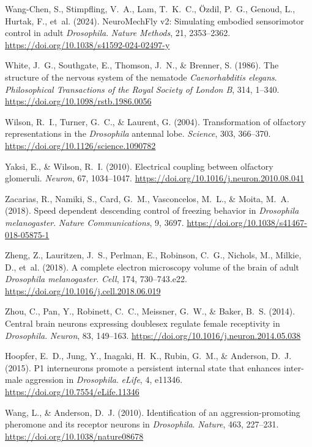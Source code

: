 Wang-Chen, S., Stimpfling, V.~A., Lam, T.~K.~C., \"{O}zdil, P.~G., Genoud, L., Hurtak, F., et~al. (2024). NeuroMechFly v2: Simulating embodied sensorimotor control in adult \emph{Drosophila}. \emph{Nature Methods}, 21, 2353--2362. \url{https://doi.org/10.1038/s41592-024-02497-y}

White, J.~G., Southgate, E., Thomson, J.~N., \& Brenner, S. (1986). The structure of the nervous system of the nematode \emph{Caenorhabditis elegans}. \emph{Philosophical Transactions of the Royal Society of London B}, 314, 1--340. \url{https://doi.org/10.1098/rstb.1986.0056}

Wilson, R.~I., Turner, G.~C., \& Laurent, G. (2004). Transformation of olfactory representations in the \emph{Drosophila} antennal lobe. \emph{Science}, 303, 366--370. \url{https://doi.org/10.1126/science.1090782}

Yaksi, E., \& Wilson, R.~I. (2010). Electrical coupling between olfactory glomeruli. \emph{Neuron}, 67, 1034--1047. \url{https://doi.org/10.1016/j.neuron.2010.08.041}

Zacarias, R., Namiki, S., Card, G.~M., Vasconcelos, M.~L., \& Moita, M.~A. (2018). Speed dependent descending control of freezing behavior in \emph{Drosophila melanogaster}. \emph{Nature Communications}, 9, 3697. \url{https://doi.org/10.1038/s41467-018-05875-1}

Zheng, Z., Lauritzen, J.~S., Perlman, E., Robinson, C.~G., Nichols, M., Milkie, D., et~al. (2018). A complete electron microscopy volume of the brain of adult \emph{Drosophila melanogaster}. \emph{Cell}, 174, 730--743.e22. \url{https://doi.org/10.1016/j.cell.2018.06.019}

Zhou, C., Pan, Y., Robinett, C.~C., Meissner, G.~W., \& Baker, B.~S. (2014). Central brain neurons expressing doublesex regulate female receptivity in \emph{Drosophila}. \emph{Neuron}, 83, 149--163. \url{https://doi.org/10.1016/j.neuron.2014.05.038}

Hoopfer, E.~D., Jung, Y., Inagaki, H.~K., Rubin, G.~M., \& Anderson, D.~J. (2015). P1 interneurons promote a persistent internal state that enhances inter-male aggression in \emph{Drosophila}. \emph{eLife}, 4, e11346. \url{https://doi.org/10.7554/eLife.11346}

Wang, L., \& Anderson, D.~J. (2010). Identification of an aggression-promoting pheromone and its receptor neurons in \emph{Drosophila}. \emph{Nature}, 463, 227--231. \url{https://doi.org/10.1038/nature08678}
